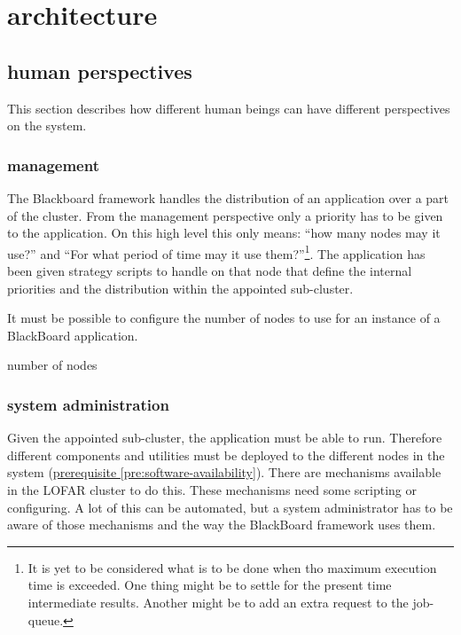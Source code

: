 \documentclass[]{lofar}
\begin{document}
  \section{architecture}
  \label{sec:architecture}\hypertarget{sec:architecture}{}

    \subsection{human perspectives}

      This section describes how different human beings can have
      different perspectives on the system.

      \subsubsection{management}

        The Blackboard framework handles the distribution of an
        application over a part of the cluster. From the management
        perspective only a priority has to be given to the
        application. On this high level this only means: ``how many
        nodes may it use?'' and ``For what period of time may it use
        them?''\footnote{It is yet to be considered what is to be done
        when tho maximum execution time is exceeded. One thing might
        be to settle for the present time intermediate
        results. Another might be to add an extra request to the
        job-queue.\label{execution-duration}}. The application has been
        given strategy scripts to handle on that node that define the
        internal priorities and the distribution within the appointed
        sub-cluster.

        \begin{requirement}
          It must be possible to configure the number of nodes to use
          for an instance of a BlackBoard application.
          \caption{number of nodes\label{req:number-of-nodes}}
        \end{requirement}

      \subsubsection{system administration}

        Given the appointed sub-cluster, the application must be able
        to run. Therefore different components and utilities must be
        deployed to the different nodes in the system
        (\hyperlink{pre:software-availability}{prerequisite \ref{pre:software-availability}}). There are
        mechanisms available in the LOFAR cluster to do this. These
        mechanisms need some scripting or configuring. A lot of this
        can be automated, but a system administrator has to be aware
        of those mechanisms and the way the BlackBoard framework uses
        them.
\end{document}
